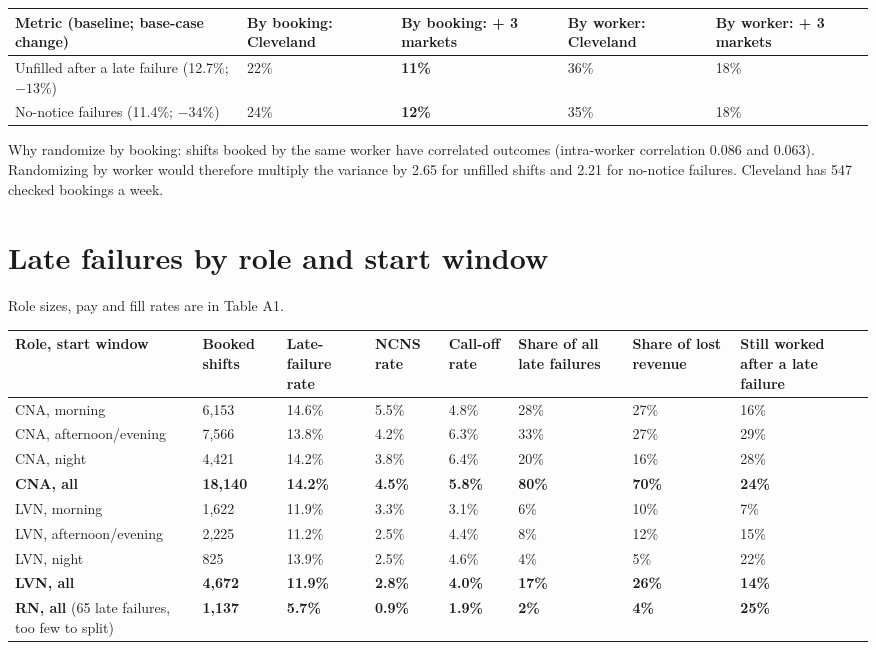 \begin{center}\small
{}
\begin{tabularx}{\textwidth}{@{}LR{1.9cm}R{1.9cm}R{1.9cm}R{1.9cm}@{}}
\toprule
Metric (baseline; base-case change) & By booking: Cleveland & By booking: + 3 markets & By worker: Cleveland & By
worker: + 3 markets \\
\midrule
Unfilled after a late failure (12.7\%; $-13\%$) & 22\% & \textbf{11\%} & 36\% & 18\% \\
No-notice failures (11.4\%; $-34\%$) & 24\% & \textbf{12\%} & 35\% & 18\% \\
\bottomrule
\end{tabularx}
\end{center}

Why randomize by booking: shifts booked by the same worker have correlated outcomes (intra-worker correlation 0.086 and
0.063). Randomizing by worker would therefore multiply the variance by 2.65 for unfilled shifts and 2.21 for no-notice
failures. Cleveland has 547 checked bookings a week.

\section{Late failures by role and start window}
Role sizes, pay and fill rates are in Table A1.

\begin{center}\small
{}
\begin{tabularx}{\textwidth}{@{}LR{1.3cm}R{1.3cm}R{1.1cm}R{1.2cm}R{1.5cm}R{1.4cm}R{1.6cm}@{}}
\toprule
Role, start window & Booked shifts & Late-failure rate & NCNS rate & Call-off rate & Share of all late failures & Share of
lost revenue & Still worked after a late failure \\
\midrule
CNA, morning & 6,153 & 14.6\% & 5.5\% & 4.8\% & 28\% & 27\% & 16\% \\
CNA, afternoon/evening & 7,566 & 13.8\% & 4.2\% & 6.3\% & 33\% & 27\% & 29\% \\
CNA, night & 4,421 & 14.2\% & 3.8\% & 6.4\% & 20\% & 16\% & 28\% \\
\textbf{CNA, all} & \textbf{18,140} & \textbf{14.2\%} & \textbf{4.5\%} & \textbf{5.8\%} & \textbf{80\%} & \textbf{70\%} &
\textbf{24\%} \\
LVN, morning & 1,622 & 11.9\% & 3.3\% & 3.1\% & 6\% & 10\% & 7\% \\
LVN, afternoon/evening & 2,225 & 11.2\% & 2.5\% & 4.4\% & 8\% & 12\% & 15\% \\
LVN, night & 825 & 13.9\% & 2.5\% & 4.6\% & 4\% & 5\% & 22\% \\
\textbf{LVN, all} & \textbf{4,672} & \textbf{11.9\%} & \textbf{2.8\%} & \textbf{4.0\%} & \textbf{17\%} & \textbf{26\%} &
\textbf{14\%} \\
\textbf{RN, all} (65 late failures, too few to split) & \textbf{1,137} & \textbf{5.7\%} & \textbf{0.9\%} & \textbf{1.9\%}
& \textbf{2\%} & \textbf{4\%} & \textbf{25\%} \\
\bottomrule
\end{tabularx}
\end{center}

